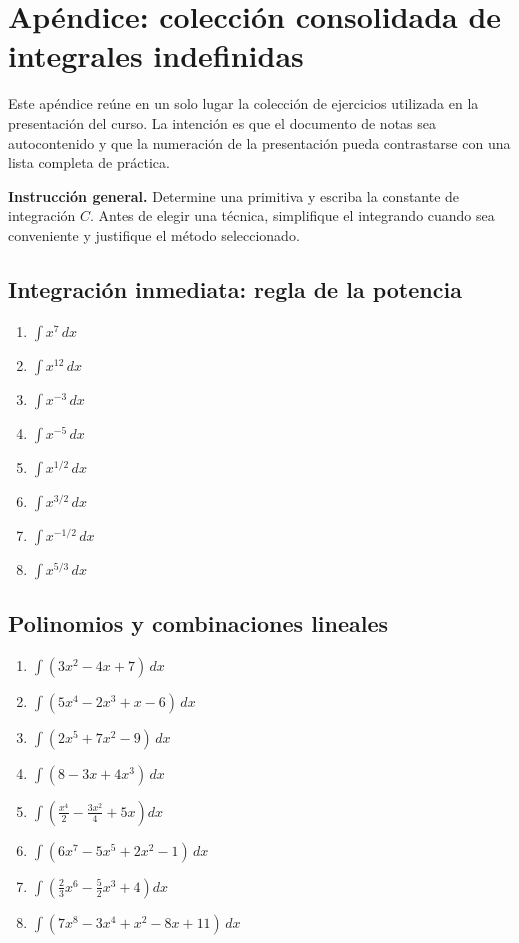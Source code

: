 \documentclass[12pt]{article}
\theoremstyle{definition}
\theoremstyle{remark}
\begin{document}
\section{Apéndice: colección consolidada de integrales indefinidas}
Este apéndice reúne en un solo lugar la colección de ejercicios utilizada en la presentación del curso. La intención es que el documento de notas sea autocontenido y que la numeración de la presentación pueda contrastarse con una lista completa de práctica.

\textbf{Instrucción general.} Determine una primitiva y escriba la constante de integración $C$. Antes de elegir una técnica, simplifique el integrando cuando sea conveniente y justifique el método seleccionado.

\subsection{Integración inmediata: regla de la potencia}
\begin{enumerate}[label=\arabic*.,start=1]
\item $\displaystyle \int x^7\,dx$
\item $\displaystyle \int x^{12}\,dx$
\item $\displaystyle \int x^{-3}\,dx$
\item $\displaystyle \int x^{-5}\,dx$
\item $\displaystyle \int x^{1/2}\,dx$
\item $\displaystyle \int x^{3/2}\,dx$
\item $\displaystyle \int x^{-1/2}\,dx$
\item $\displaystyle \int x^{5/3}\,dx$
\end{enumerate}

\subsection{Polinomios y combinaciones lineales}
\begin{enumerate}[label=\arabic*.,start=9]
\item $\displaystyle \int(3x^2-4x+7)\,dx$
\item $\displaystyle \int(5x^4-2x^3+x-6)\,dx$
\item $\displaystyle \int(2x^5+7x^2-9)\,dx$
\item $\displaystyle \int(8-3x+4x^3)\,dx$
\item $\displaystyle \int\left(\frac{x^4}{2}-\frac{3x^2}{4}+5x\right)dx$
\item $\displaystyle \int(6x^7-5x^5+2x^2-1)\,dx$
\item $\displaystyle \int\left(\frac{2}{3}x^6-\frac{5}{2}x^3+4\right)dx$
\item $\displaystyle \int(7x^8-3x^4+x^2-8x+11)\,dx$
\end{enumerate}
\end{document}
